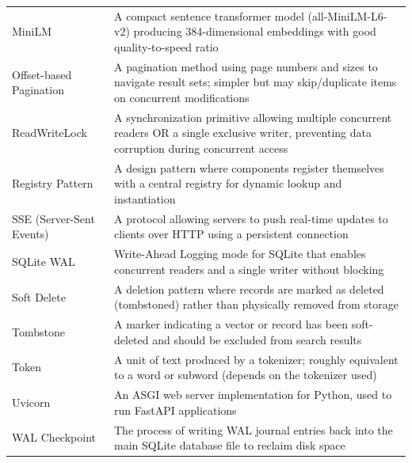 \documentclass[11pt,a4paper]{article}
\begin{document}
\begin{longtable}{@{}p{3.5cm}p{10cm}@{}}
MiniLM & A compact sentence transformer model (all-MiniLM-L6-v2) producing 384-dimensional embeddings with good quality-to-speed ratio \\
Offset-based Pagination & A pagination method using page numbers and sizes to navigate result sets; simpler but may skip/duplicate items on concurrent modifications \\
ReadWriteLock & A synchronization primitive allowing multiple concurrent readers OR a single exclusive writer, preventing data corruption during concurrent access \\
Registry Pattern & A design pattern where components register themselves with a central registry for dynamic lookup and instantiation \\
SSE (Server-Sent Events) & A protocol allowing servers to push real-time updates to clients over HTTP using a persistent connection \\
SQLite WAL & Write-Ahead Logging mode for SQLite that enables concurrent readers and a single writer without blocking \\
Soft Delete & A deletion pattern where records are marked as deleted (tombstoned) rather than physically removed from storage \\
Tombstone & A marker indicating a vector or record has been soft-deleted and should be excluded from search results \\
Token & A unit of text produced by a tokenizer; roughly equivalent to a word or subword (depends on the tokenizer used) \\
Uvicorn & An ASGI web server implementation for Python, used to run FastAPI applications \\
WAL Checkpoint & The process of writing WAL journal entries back into the main SQLite database file to reclaim disk space \\
\bottomrule
\end{longtable}

\end{document}
